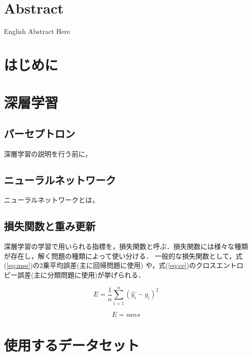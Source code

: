 \documentclass[a4j, 11pt]{jarticle}
\begin{document}
\section*{Abstract}
English Abstract Here


\newpage
\tableofcontents       %
\thispagestyle{empty}  %
\pagebreak
{} %


\section{はじめに}

\newpage
\section{深層学習}
\subsection{パーセプトロン}
深層学習の説明を行う前に，

\subsection{ニューラルネットワーク}
ニューラルネットワークとは，

\newpage
\subsection{損失関数と重み更新}
深層学習の学習で用いられる指標を，損失関数と呼ぶ．損失関数には様々な種類が存在し，解く問題の種類によって使い分ける．
一般的な損失関数として，式(\ref{eq:mse})の2乗平均誤差(主に回帰問題に使用) や，式(\ref{eq:ce})のクロスエントロピー誤差(主に分類問題に使用)が挙げられる．

\begin{equation}
	E = \frac{1}{n} \sum_{i=1}^{n} (\hat{y_i} - y_i)^2
	\label{eq:mse}
\end{equation}

\begin{equation}
	E = sans
	\label{eq:ce}
\end{equation}


\newpage
\section{使用するデータセット}
\end{document}
